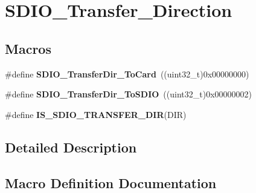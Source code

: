 \hypertarget{group___s_d_i_o___transfer___direction}{}\section{S\+D\+I\+O\+\_\+\+Transfer\+\_\+\+Direction}
\label{group___s_d_i_o___transfer___direction}
\subsection*{Macros}
\begin{DoxyCompactItemize}
\item 
\hypertarget{group___s_d_i_o___transfer___direction_gaef8af0ffa4ea04b3362338d268cc0935}{}\#define {\bfseries S\+D\+I\+O\+\_\+\+Transfer\+Dir\+\_\+\+To\+Card}~((uint32\+\_\+t)0x00000000)\label{group___s_d_i_o___transfer___direction_gaef8af0ffa4ea04b3362338d268cc0935}

\item 
\hypertarget{group___s_d_i_o___transfer___direction_ga55a6d9613d3e2e7762296b45d0d13222}{}\#define {\bfseries S\+D\+I\+O\+\_\+\+Transfer\+Dir\+\_\+\+To\+S\+D\+I\+O}~((uint32\+\_\+t)0x00000002)\label{group___s_d_i_o___transfer___direction_ga55a6d9613d3e2e7762296b45d0d13222}

\item 
\#define {\bfseries I\+S\+\_\+\+S\+D\+I\+O\+\_\+\+T\+R\+A\+N\+S\+F\+E\+R\+\_\+\+D\+I\+R}(D\+I\+R)
\end{DoxyCompactItemize}


\subsection{Detailed Description}


\subsection{Macro Definition Documentation}
\hypertarget{group___s_d_i_o___transfer___direction_gaf84b8004cfef6a5a525b20db8a83c2f7}{}
